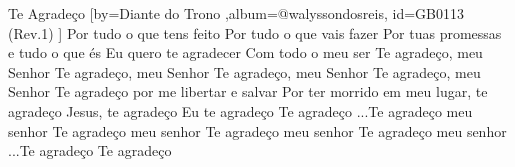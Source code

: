 \beginsong
{Te Agradeço %
}[by={Diante do Trono %
},album={@walyssondosreis},
id={GB0113 %
(Rev.1) %
}]
\beginverse
Por tudo o que tens feito
Por tudo o que vais fazer
Por tuas promessas e tudo o que és
Eu quero te agradecer
Com todo o meu ser
\endverse
\beginverse
Te agradeço, meu Senhor
Te agradeço, meu Senhor
Te agradeço, meu Senhor
Te agradeço, meu Senhor
\endverse
\beginchorus
Te agradeço por me libertar e salvar
Por ter morrido em meu lugar, te agradeço
Jesus, te agradeço
Eu te agradeço
Te agradeço
\endchorus
{}
\beginverse
...Te agradeço meu senhor
Te agradeço meu senhor
Te agradeço meu senhor
Te agradeço meu senhor
\endverse
{}
\beginverse
...Te agradeço
Te agradeço
\endverse

